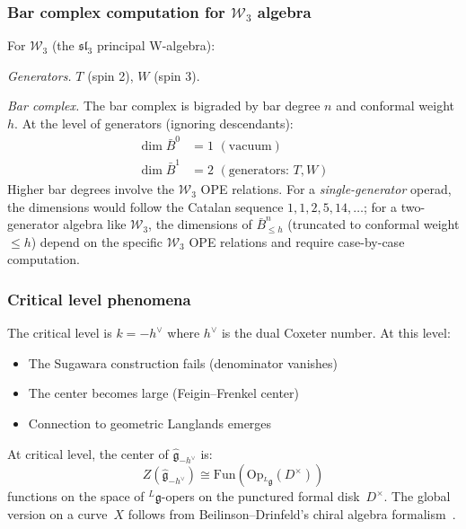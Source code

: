 \subsubsection{\texorpdfstring{Bar complex computation for $\mathcal{W}_3$ algebra}{Bar complex computation for W 3 algebra}}

\begin{example}\label{ex:w3-bar}
For $\mathcal{W}_3$ (the $\mathfrak{sl}_3$ principal W-algebra):

\emph{Generators.} $T$ (spin 2), $W$ (spin 3).

\emph{Bar complex.}
The bar complex is bigraded by bar degree $n$ and conformal weight $h$. At the level of generators (ignoring descendants):
\begin{align}
\dim \bar{B}^0 &= 1 \,\, (\text{vacuum}) \\
\dim \bar{B}^1 &= 2 \,\, (\text{generators: } T, W)
\end{align}
Higher bar degrees involve the $\mathcal{W}_3$ OPE relations.  For a \emph{single-generator} operad, the dimensions would follow the Catalan sequence $1, 1, 2, 5, 14, \ldots$; for a two-generator algebra like $\mathcal{W}_3$, the dimensions of $\bar{B}^n_{\leq h}$ (truncated to conformal weight $\leq h$) depend on the specific $\mathcal{W}_3$ OPE relations and require case-by-case computation.
\end{example}

\subsubsection{Critical level phenomena}

\begin{definition}\label{def:critical}
The critical level is $k = -h^\vee$ where $h^\vee$ is the dual Coxeter number. At this level:
\begin{itemize}
\item The Sugawara construction fails (denominator vanishes)
\item The center becomes large (Feigin--Frenkel center)
\item Connection to geometric Langlands emerges
\end{itemize}
\end{definition}

\begin{theorem}\label{thm:ff-center}
At critical level, the center of $\widehat{\mathfrak{g}}_{-h^\vee}$ is:
\[
Z(\widehat{\mathfrak{g}}_{-h^\vee}) \cong \mathrm{Fun}(\mathrm{Op}_{{}^L\mathfrak{g}}(D^\times))
\]
functions on the space of ${}^L\mathfrak{g}$-opers on the punctured formal disk~$D^\times$.  The global version on a curve~$X$ follows from Beilinson--Drinfeld's chiral algebra formalism~\cite{BD04}.
\end{theorem}

